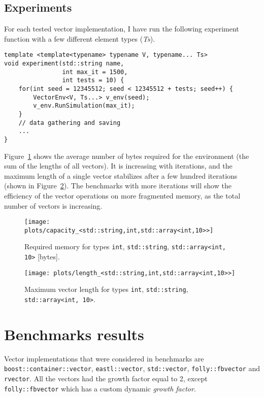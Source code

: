 \documentclass[inz, english, shortabstract]{iithesis}
\begin{document}
\section{Experiments}

For each tested vector implementation, I have run the following experiment function with a few different element types ({\it Ts}). 

\begin{lstlisting}[caption=experiment function]
template <template<typename> typename V, typename... Ts>
void experiment(std::string name, 
				int max_it = 1500, 
				int tests = 10) {
	for(int seed = 12345512; seed < 12345512 + tests; seed++) {
		VectorEnv<V, Ts...> v_env(seed);
		v_env.RunSimulation(max_it);
	}
	// data gathering and saving
	...
}
\end{lstlisting}

Figure~\ref{space_consumption} shows the average number of bytes required for the environment (the sum of the lengths of all vectors).
It is increasing with iterations, and the maximum length of a single vector stabilizes after a few hundred iterations (shown in Figure~\ref{vector_length}).
The benchmarks with more iterations will show the efficiency of the vector operations on more fragmented memory, as the total number of vectors is increasing.

\begin{figure}[h!]
\texttt{[image: plots/capacity\_<std::string,int,std::array<int,10>>]}
\caption{Required memory for types \lstinline{int}, \lstinline{std::string}, \lstinline{std::array<int, 10>}{} [bytes].}
\label{space_consumption}
\end{figure}

\begin{figure}[h!]
\texttt{[image: plots/length\_<std::string,int,std::array<int,10>>]}
\caption{Maximum vector length for types \lstinline{int}, \lstinline{std::string}, \lstinline{std::array<int, 10>}{}.}
\label{vector_length}
\end{figure}

\chapter{Benchmarks results}
Vector implementations that were considered in benchmarks are {\tt boost::container::vector}, {\tt eastl::vector}, {\tt std::vector}, {\tt folly::fbvector} and {\tt rvector}.
All the vectors had the growth factor equal to 2, except {\tt folly::fbvector} which has a custom dynamic \emph{growth factor}.
\end{document}
